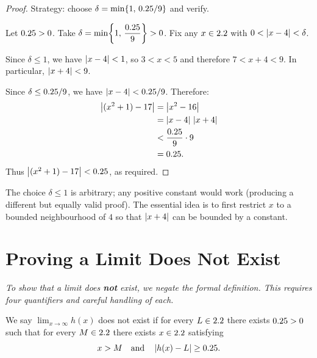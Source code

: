 \begin{proof}
Strategy: choose $\delta = \min\{1,\, 0.25/9\}$ and verify.

Let $0.25 > 0$.  Take $\delta = \min\!\left\{1,\, \dfrac{0.25}{9}\right\} > 0$.  Fix any $x \in 2.2$ with $0 < \left\lvert x - 4 \right\rvert < \delta$.

Since $\delta \leq 1$, we have $\left\lvert x - 4 \right\rvert < 1$, so $3 < x < 5$ and therefore $7 < x + 4 < 9$.  In particular, $\left\lvert x + 4 \right\rvert < 9$.

Since $\delta \leq 0.25/9$, we have $\left\lvert x - 4 \right\rvert < 0.25/9$.  Therefore:
\begin{align*}
  \left\lvert (x^{2} + 1) - 17 \right\rvert
    &= \left\lvert x^{2} - 16 \right\rvert \\
    &= \left\lvert x - 4 \right\rvert\,\left\lvert x + 4 \right\rvert \\
    &< \dfrac{0.25}{9} \cdot 9 \\
    &= 0.25.
\end{align*}
Thus $\left\lvert (x^{2}+1)-17 \right\rvert < 0.25$, as required.
\end{proof}

\begin{remark}
The choice $\delta \leq 1$ is arbitrary; any positive constant would work (producing a different but equally valid proof).  The essential idea is to first restrict $x$ to a bounded neighbourhood of $4$ so that $\left\lvert x+4 \right\rvert$ can be bounded by a constant.
\end{remark}

\section{Proving a Limit Does Not Exist}
\label{sec:2.9}

\textit{To show that a limit does \textbf{not} exist, we negate the formal definition.  This requires four quantifiers and careful handling of each.}

\begin{definition}
\label{def:2-4}
We say $\lim_{x \to \infty} h(x)$ does not exist if for every $L \in 2.2$ there exists $0.25 > 0$ such that for every $M \in 2.2$ there exists $x \in 2.2$ satisfying
\[
  x > M \quad\text{and}\quad \left\lvert h(x) - L \right\rvert \geq 0.25.
\]
\end{definition}


